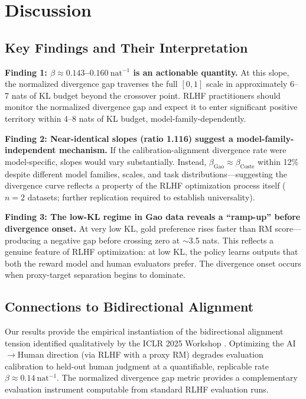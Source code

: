 \section{Discussion}
\label{sec:discussion}

\subsection{Key Findings and Their Interpretation}

\textbf{Finding 1: $\beta \approx 0.143$--$0.160\ \text{nat}^{-1}$ is an actionable quantity.} At this slope, the normalized divergence gap traverses the full $[0,1]$ scale in approximately 6--7 nats of KL budget beyond the crossover point. RLHF practitioners should monitor the normalized divergence gap and expect it to enter significant positive territory within 4--8 nats of KL budget, model-family-dependently.

\textbf{Finding 2: Near-identical slopes (ratio 1.116) suggest a model-family-independent mechanism.} If the calibration-alignment divergence rate were model-specific, slopes would vary substantially. Instead, $\beta_\text{Gao} \approx \beta_\text{Coste}$ within 12\% despite different model families, scales, and task distributions---suggesting the divergence curve reflects a property of the RLHF optimization process itself ($n=2$ datasets; further replication required to establish universality).

\textbf{Finding 3: The low-KL regime in Gao data reveals a ``ramp-up'' before divergence onset.} At very low KL, gold preference rises faster than RM score---producing a negative gap before crossing zero at $\sim$3.5 nats. This reflects a genuine feature of RLHF optimization: at low KL, the policy learns outputs that both the reward model and human evaluators prefer. The divergence onset occurs when proxy-target separation begins to dominate.

\subsection{Connections to Bidirectional Alignment}

Our results provide the empirical instantiation of the bidirectional alignment tension identified qualitatively by the ICLR 2025 Workshop \cite{ICLR2025Bidirectional}. Optimizing the AI$\to$Human direction (via RLHF with a proxy RM) degrades evaluation calibration to held-out human judgment at a quantifiable, replicable rate $\beta \approx 0.14\ \text{nat}^{-1}$. The normalized divergence gap metric provides a complementary evaluation instrument computable from standard RLHF evaluation runs.

